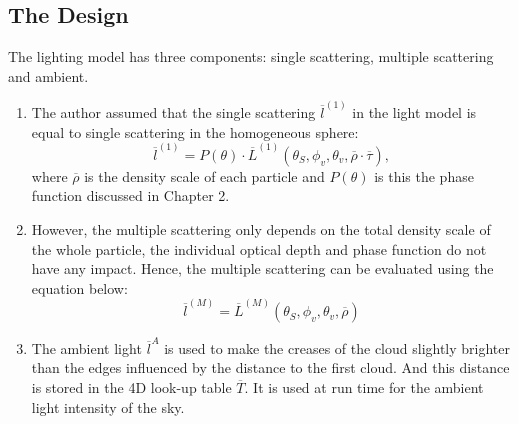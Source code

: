 \subsection{The Design}
The lighting model has three components: single scattering, multiple scattering and ambient. 

\begin{enumerate}
\item The author assumed that the single scattering $\overline{l}^{(1)}$ in the light model is equal to single scattering in the homogeneous sphere:
\begin{equation}
\overline{l}^{(1)} = P(\theta) \cdot \overline{L}^{(1)}(\theta_S, \phi_v, \theta_v, \overline{\rho} \cdot \overline{\tau}),
\end{equation}
where $\overline{\rho}$ is the density scale of each particle and $P(\theta)$ is this the phase function discussed in Chapter 2.

\item However, the multiple scattering only depends on the total density scale of the whole particle, the individual optical depth and phase function do not have any impact. Hence, the multiple scattering can be evaluated using the equation below:
\begin{equation}
\overline{l}^{(M)} = \overline{L}^{(M)}(\theta_S, \phi_v, \theta_v, \overline{\rho})
\end{equation}

\item The ambient light $\overline{l}^{A}$ is used to make the creases of the cloud slightly brighter than the edges influenced by the distance to the first cloud. And this distance is stored in the 4D look-up table $\overline{T}$. It is used at run time for the ambient light intensity of the sky.
\end{enumerate}
 

